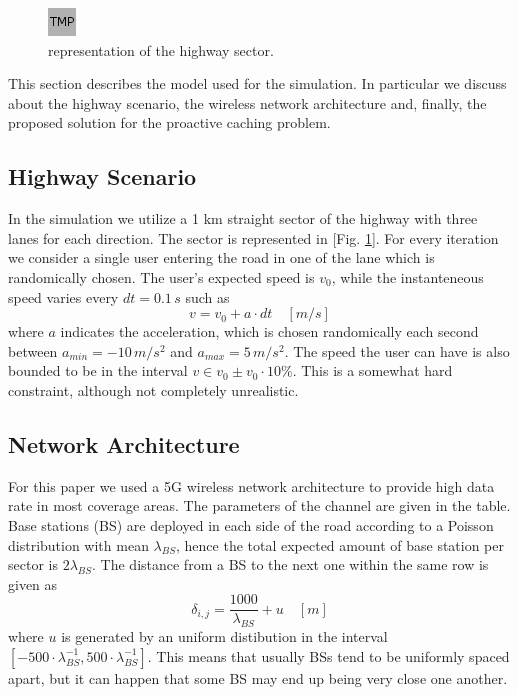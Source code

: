 \documentclass[conference,10pt]{IEEEtran}
\begin{document}
\begin{figure}
	\centering
	\includegraphics{placeholder.png}
	\caption{representation of the highway sector.}
	\label{fig:highway_sector}
\end{figure}

This section describes the model used for the simulation. In particular we discuss about the highway scenario, the wireless network architecture and, finally, the proposed solution for the proactive caching problem.

\subsection{Highway Scenario}
In the simulation we utilize a 1 km straight sector of the highway with three lanes for each direction. The sector is represented in [Fig. \ref{fig:highway_sector}]. For every iteration we consider a single user entering the road in one of the lane which is randomically chosen. The user's expected speed is $v_0$, while the instanteneous speed varies every $dt = 0.1\, s$ such as
\begin{equation}
	\label{eq:speed}
	v = v_0+a\cdot dt \quad [m\!/\!s]
\end{equation}
where $a$ indicates the acceleration, which is chosen randomically each second between $a_{min}=-10\,m\!/\!s^2$ and $a_{max}=5\,m\!/\!s^2$. The speed the user can have is also bounded to be in the interval $v \in v_0 \pm v_0 \cdot 10\%$. This is a somewhat hard constraint, although not completely unrealistic.

\subsection{Network Architecture}
For this paper we used a 5G wireless network architecture to provide high data rate in most coverage areas. The parameters of the channel are given in the table. Base stations (BS) are deployed in each side of the road according to a Poisson distribution with mean $\lambda_{BS}$, hence the total expected amount of base station per sector is $2\lambda_{BS}$. The distance from a BS to the next one within the same row is given as
\begin{equation}
	\label{eq:distance}
	\delta_{i, j} = \frac{1000}{\lambda_{BS}}+u \quad [m]
\end{equation}
where $u$ is generated by an uniform distibution in the interval $[-500\cdot\lambda_{BS}^{-1},500\cdot\lambda_{BS}^{-1}]$. This means that usually BSs tend to be uniformly spaced apart, but it can happen that some BS may end up being very close one another.  
\end{document}
